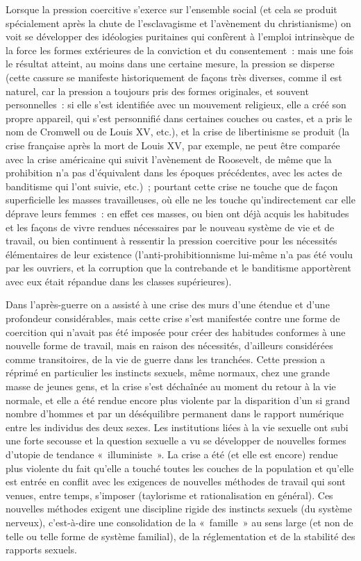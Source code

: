 \documentclass[french,twoside]{book} %
\begin{document}
Lorsque la pression coercitive s’exerce sur l’ensemble social (et cela se produit spécialement après la chute de l’esclavagisme et l’avènement du christianisme) on voit se développer des idéologies puritaines qui confèrent à l’emploi intrinsèque de la force les formes extérieures de la conviction et du consentement : mais une fois le résultat atteint, au moins dans une certaine mesure, la pression se disperse (cette cassure se manifeste historiquement de façons très diverses, comme il est naturel, car la pression a toujours pris des formes originales, et souvent personnelles : si elle s’est identifiée avec un mouvement religieux, elle a créé son propre appareil, qui s’est personnifié dans certaines couches ou castes, et a pris le nom de Cromwell ou de Louis XV, etc.), et la crise de libertinisme se produit (la crise française après la mort de Louis XV, par exemple, ne peut être comparée avec la crise américaine qui suivit l’avènement de Roosevelt, de même que la prohibition n’a pas d’équivalent dans les époques précédentes, avec les actes de banditisme qui l’ont suivie, etc.) ; pourtant cette crise ne touche que de façon superficielle les masses travailleuses, où elle ne les touche qu’indirectement car elle déprave leurs femmes : en effet ces masses, ou bien ont déjà acquis les habitudes et les façons de vivre rendues nécessaires par le nouveau système de vie et de travail, ou bien continuent à ressentir la pression coercitive pour les nécessités élémentaires de leur existence (l’anti-prohibitionnisme lui-même n’a pas été voulu par les ouvriers, et la corruption que la contrebande et le banditisme apportèrent avec eux était répandue dans les classes supérieures).\par
Dans l’après-guerre on a assisté à une crise des murs d’une étendue et d’une profondeur considérables, mais cette crise s’est manifestée contre une forme de coercition qui n’avait pas été imposée pour créer des habitudes conformes à une nouvelle forme de travail, mais en raison des nécessités, d’ailleurs considérées comme transitoires, de la vie de guerre dans les tranchées. Cette pression a réprimé en particulier les instincts sexuels, même normaux, chez une grande masse de jeunes gens, et la crise s’est déchaînée au moment du retour à la vie normale, et elle a été rendue encore plus violente par la disparition d’un si grand nombre d’hommes et par un déséquilibre permanent dans le rapport numérique entre les individus des deux sexes. Les institutions liées à la vie sexuelle ont subi une forte secousse et la question sexuelle a vu se développer de nouvelles formes d’utopie de tendance « illuministe ». La crise a été (et elle est encore) rendue plus violente du fait qu’elle a touché toutes les couches de la population et qu’elle est entrée en conflit avec les exigences de nouvelles méthodes de travail qui sont venues, entre temps, s’imposer (taylorisme et rationalisation en général). Ces nouvelles méthodes exigent une discipline rigide des instincts sexuels (du système nerveux), c’est-à-dire une consolidation de la « famille » au sens large (et non de telle ou telle forme de système familial), de la réglementation et de la stabilité des rapports sexuels.\par
\end{document}
